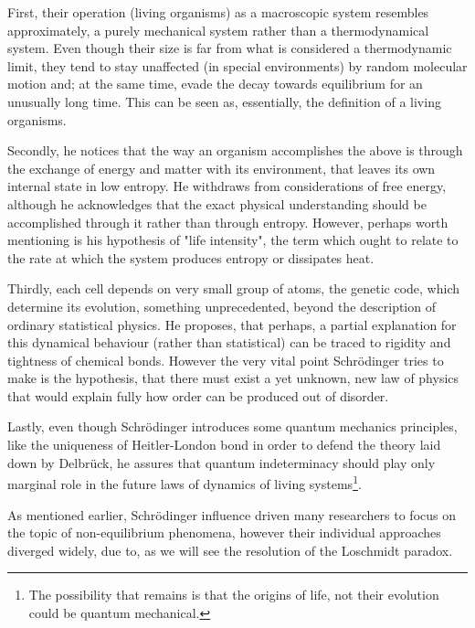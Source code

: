 \documentclass[a4paper,12pt]{article}
\begin{document}

First, their operation (living organisms) as a macroscopic system resembles approximately, a purely mechanical system rather than a thermodynamical system. 
Even though their size is far from what is considered a thermodynamic limit, they tend to stay unaffected (in special environments) by random molecular motion and; at the same time, evade the decay towards equilibrium for an unusually long time. This can be seen as, essentially, the definition of a living organisms.

Secondly, he notices that the way an organism accomplishes the above is through the exchange of energy and matter with its environment, that leaves its own internal state in low entropy. He withdraws from considerations of free energy, although he acknowledges that the exact physical understanding should be accomplished through it rather than through entropy. However, perhaps worth mentioning is his hypothesis of "life intensity", the term which ought to relate to the rate at which the system produces entropy or dissipates heat.

Thirdly, each cell depends on very small group of atoms, the genetic code, which determine its evolution, something unprecedented, beyond the description of ordinary statistical physics. He proposes, that perhaps, a partial explanation for this dynamical behaviour (rather than statistical) can be traced to rigidity and tightness of chemical bonds. However the very vital point Schrödinger tries to make is the hypothesis, that there must exist a yet unknown, new law of physics that would explain fully how order can be produced out of disorder. 

Lastly, even though Schrödinger introduces some quantum mechanics principles, like the uniqueness of Heitler-London bond in order to defend the theory laid down by Delbrück, he assures that quantum indeterminacy should play only marginal role in the future laws of dynamics of living systems\footnote{The possibility that remains is that the origins of life, not their evolution could be quantum mechanical.}.

As mentioned earlier, Schrödinger influence driven many researchers to focus on the topic of non-equilibrium phenomena, however their individual approaches diverged widely, due to, as we will see the resolution of the Loschmidt paradox.
\end{document}
